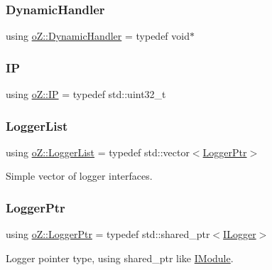 \subsubsection{\texorpdfstring{DynamicHandler}{DynamicHandler}}
{\footnotesize\ttfamily using \mbox{\hyperlink{namespaceo_z_acbfabf71824b5fc6a3beb64e397afc19}{o\+Z\+::\+Dynamic\+Handler}} = typedef void$\ast$}

\mbox{\label{namespaceo_z_ace55c2d0182a14ceea9649d0d0cf9c4a}} 
\subsubsection{\texorpdfstring{IP}{IP}}
{\footnotesize\ttfamily using \mbox{\hyperlink{namespaceo_z_ace55c2d0182a14ceea9649d0d0cf9c4a}{o\+Z\+::\+IP}} = typedef std\+::uint32\+\_\+t}

\mbox{\label{namespaceo_z_a2d18a70272709242e8e7ebffc3f1806c}} 
\subsubsection{\texorpdfstring{LoggerList}{LoggerList}}
{\footnotesize\ttfamily using \mbox{\hyperlink{namespaceo_z_a2d18a70272709242e8e7ebffc3f1806c}{o\+Z\+::\+Logger\+List}} = typedef std\+::vector$<$\mbox{\hyperlink{namespaceo_z_aaa2fbabbfafc6616a7e69651b62a3d4e}{Logger\+Ptr}}$>$}



Simple vector of logger interfaces. 

\mbox{\label{namespaceo_z_aaa2fbabbfafc6616a7e69651b62a3d4e}} 
\subsubsection{\texorpdfstring{LoggerPtr}{LoggerPtr}}
{\footnotesize\ttfamily using \mbox{\hyperlink{namespaceo_z_aaa2fbabbfafc6616a7e69651b62a3d4e}{o\+Z\+::\+Logger\+Ptr}} = typedef std\+::shared\+\_\+ptr$<$\mbox{\hyperlink{classo_z_1_1_i_logger}{I\+Logger}}$>$}



Logger pointer type, using shared\+\_\+ptr like \mbox{\hyperlink{classo_z_1_1_i_module}{I\+Module}}. 

